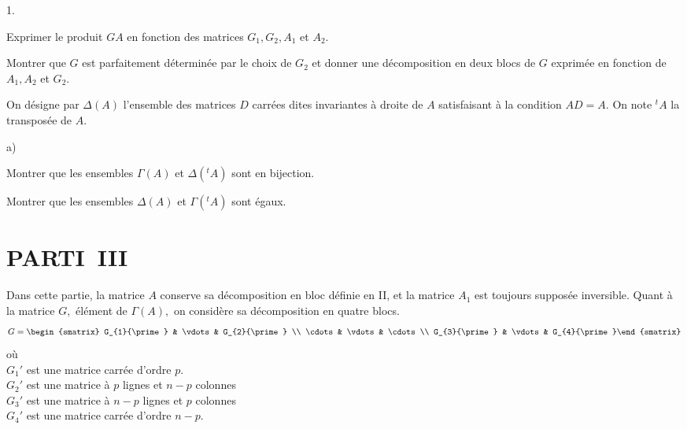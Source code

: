 \documentclass[11pt]{article}%
\begin{document}
\begin{noliste}{1.}
 \setlength{\itemsep}{4mm}
\item Exprimer le produit $GA$ en fonction des matrices
$G_{1},G_{2},A_{1}$
et $A_{2}.$

\item Montrer que $G$ est parfaitement déterminée par le choix de
$G_{2}$ et
donner une décomposition en deux blocs de $G$ exprimée en fonction de
$A_{1},A_{2}$ et $G_{2}.$

\item On désigne par $\Delta (A)$ l'ensemble des matrices $D$ carrées
dites
invariantes à droite de $A$ satisfaisant à la condition $AD = A.$ On
note $^{t}A$ la transposée de $A.$

\begin{noliste}{a)}
 \setlength{\itemsep}{2mm}
\item Montrer que les ensembles $\Gamma (A)$ et $\Delta (^{t}A)$ sont
en
bijection.

\item Montrer que les ensembles $\Delta (A)$ et $\Gamma (^{t}A)$ sont
égaux.
\end{noliste}
\end{noliste}

\section*{PARTI\E\ III}

Dans cette partie, la matrice $A$ conserve sa décomposition en bloc
définie
en II, et la matrice $A_{1}$ est toujours supposée inversible. Quant à
la
matrice $G,$ élément de $\Gamma (A),$ on considère sa décomposition en
quatre blocs.
\[
G = 
\begin{smatrix}
G_{1}{\prime } & \vdots & G_{2}{\prime } \\
\cdots & \vdots & \cdots \\
G_{3}{\prime } & \vdots & G_{4}{\prime }\end{smatrix}
\]
où \\
$G_{1}{\prime }$ est une matrice carrée d'ordre $p.$\\
$G_{2}{\prime }$ est une matrice à $p$ lignes et $n-p$ colonnes\\
$G_{3}{\prime }$ est une matrice à $n-p$ lignes et $p$ colonnes\\
$G_{4}{\prime }$ est une matrice carrée d'ordre $n-p.$
\end{document}
